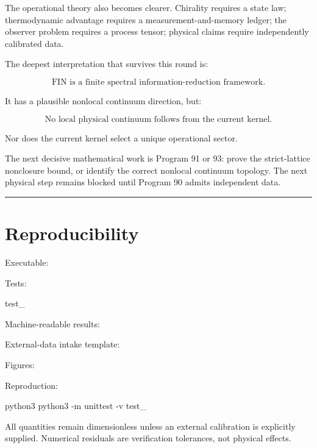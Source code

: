 \documentclass[11pt,a4paper,openany]{report}
\begin{document}
The operational theory also becomes clearer. Chirality requires a state law; thermodynamic advantage requires a measurement-and-memory ledger; the observer problem requires a process tensor; physical claims require independently calibrated data.

The deepest interpretation that survives this round is:

\[
\boxed{
\text{FIN is a finite spectral information-reduction framework.}
}
\]

It has a plausible nonlocal continuum direction, but:

\[
\boxed{
\text{No local physical continuum follows from the current kernel.}
}
\]

Nor does the current kernel select a unique operational sector.

The next decisive mathematical work is Program 91 or 93: prove the strict-lattice nonclosure bound, or identify the correct nonlocal continuum topology. The next physical step remains blocked until Program 90 admits independent data.

\par\medskip\hrule\medskip

\chapter{Reproducibility}

Executable:


Tests:

test\_

Machine-readable results:


External-data intake template:


Figures:


Reproduction:

python3  python3 -m unittest -v test\_

All quantities remain dimensionless unless an external calibration is explicitly supplied. Numerical residuals are verification tolerances, not physical effects.
\end{document}
